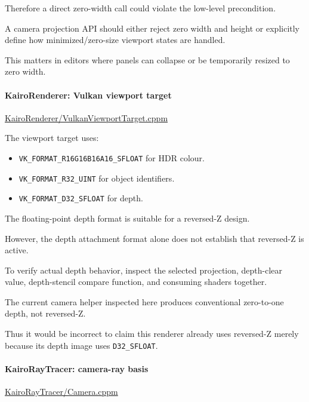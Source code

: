Therefore a direct zero-width call could violate the low-level precondition.

A camera projection API should either reject zero width and height or explicitly define how minimized/zero-size viewport states are handled.

This matters in editors where panels can collapse or be temporarily resized to zero width.

\paragraph{KairoRenderer: Vulkan viewport target}\label{kairorenderer-vulkan-viewport-target}

\href{https://github.com/swayam8624/KairoRenderer/blob/main/VulkanViewportTarget.cppm?utm_source=chatgpt.com}{KairoRenderer/VulkanViewportTarget.cppm}

The viewport target uses:

\begin{itemize}
\tightlist
\item
  \texttt{VK\_FORMAT\_R16G16B16A16\_SFLOAT} for HDR colour.
\item
  \texttt{VK\_FORMAT\_R32\_UINT} for object identifiers.
\item
  \texttt{VK\_FORMAT\_D32\_SFLOAT} for depth.
\end{itemize}

The floating-point depth format is suitable for a reversed-Z design.

However, the depth attachment format alone does not establish that reversed-Z is active.

To verify actual depth behavior, inspect the selected projection, depth-clear value, depth-stencil compare function, and consuming shaders together.

The current camera helper inspected here produces conventional zero-to-one depth, not reversed-Z.

Thus it would be incorrect to claim this renderer already uses reversed-Z merely because its depth image uses \texttt{D32\_SFLOAT}.

\paragraph{KairoRayTracer: camera-ray basis}\label{kairoraytracer-camera-ray-basis}

\href{https://github.com/swayam8624/KairoRayTracer/blob/main/Camera.cppm?utm_source=chatgpt.com}{KairoRayTracer/Camera.cppm}

